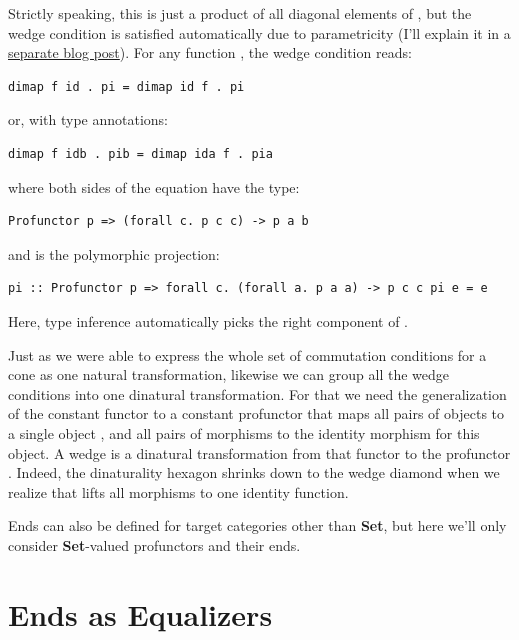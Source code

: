 Strictly speaking, this is just a product of all diagonal elements of
, but the wedge condition is satisfied automatically due to
parametricity (I'll explain it in a
\href{https://bartoszmilewski.com/2017/04/11/profunctor-parametricity/}{separate
blog post}). For any function , the
wedge condition reads:

\begin{verbatim}
dimap f id . pi = dimap id f . pi
\end{verbatim}

or, with type annotations:

\begin{verbatim}
dimap f idb . pib = dimap ida f . pia
\end{verbatim}

where both sides of the equation have the type:

\begin{verbatim}
Profunctor p => (forall c. p c c) -> p a b
\end{verbatim}

and  is the polymorphic projection:

\begin{verbatim}
pi :: Profunctor p => forall c. (forall a. p a a) -> p c c pi e = e
\end{verbatim}

Here, type inference automatically picks the right component of
.

Just as we were able to express the whole set of commutation conditions
for a cone as one natural transformation, likewise we can group all the
wedge conditions into one dinatural transformation. For that we need the
generalization of the constant functor  to a constant
profunctor that maps all pairs of objects to a single object ,
and all pairs of morphisms to the identity morphism for this object. A
wedge is a dinatural transformation from that functor to the profunctor
. Indeed, the dinaturality hexagon shrinks down to the wedge
diamond when we realize that  lifts all morphisms to one
identity function.

Ends can also be defined for target categories other than \textbf{Set},
but here we'll only consider \textbf{Set}-valued profunctors and their
ends.

\section{Ends as Equalizers}\label{ends-as-equalizers}

